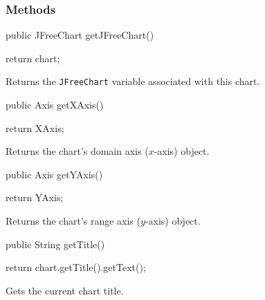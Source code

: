 \subsubsection*{Methods}

\begin{code}

   public JFreeChart getJFreeChart() \begin{hide} {
      return chart;
   }\end{hide}
\end{code}
\begin{tabb}
   Returns the \texttt{JFreeChart} variable associated with this chart.
\end{tabb}
\begin{htmlonly}
\end{htmlonly}
\begin{code}

   public Axis getXAxis() \begin{hide} {
      return XAxis;
   }\end{hide}
\end{code}
\begin{tabb}
   Returns the chart's domain axis ($x$-axis) object.
\end{tabb}
\begin{htmlonly}
\end{htmlonly}
\begin{code}

   public Axis getYAxis() \begin{hide} {
      return YAxis;
   }\end{hide}
\end{code}
\begin{tabb}
   Returns the chart's range axis ($y$-axis) object.
\end{tabb}
\begin{htmlonly}
\end{htmlonly}
\begin{code}

   public String getTitle() \begin{hide} {
      return chart.getTitle().getText();
   }\end{hide}
\end{code}
\begin{tabb}
   Gets the current chart title.
\end{tabb}
